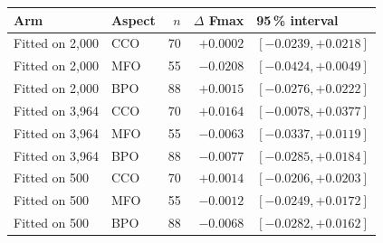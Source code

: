 \begin{tabular}{llrrl}
\toprule
    \textbf{Arm} & \textbf{Aspect} & \textbf{$n$} & \textbf{$\Delta$ Fmax} & \textbf{95\,\% interval} \\
\midrule
    Fitted on 2,000 & CCO & 70 & $+0.0002$ & $[-0.0239, +0.0218]$ \\
    Fitted on 2,000 & MFO & 55 & $-0.0208$ & $[-0.0424, +0.0049]$ \\
    Fitted on 2,000 & BPO & 88 & $+0.0015$ & $[-0.0276, +0.0222]$ \\
    Fitted on 3,964 & CCO & 70 & $+0.0164$ & $[-0.0078, +0.0377]$ \\
    Fitted on 3,964 & MFO & 55 & $-0.0063$ & $[-0.0337, +0.0119]$ \\
    Fitted on 3,964 & BPO & 88 & $-0.0077$ & $[-0.0285, +0.0184]$ \\
    Fitted on 500 & CCO & 70 & $+0.0014$ & $[-0.0206, +0.0203]$ \\
    Fitted on 500 & MFO & 55 & $-0.0012$ & $[-0.0249, +0.0172]$ \\
    Fitted on 500 & BPO & 88 & $-0.0068$ & $[-0.0282, +0.0162]$ \\
\bottomrule
\end{tabular}
